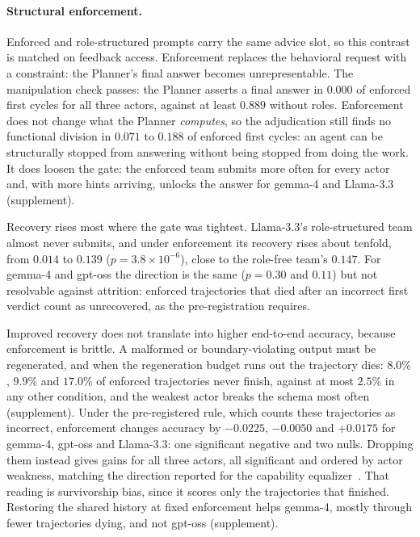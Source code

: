 \paragraph{Structural enforcement.} \label{subsec:enforce} Enforced and role-structured prompts carry the same advice slot, so this
contrast is matched on feedback access. Enforcement replaces the behavioral
request with a constraint: the Planner's final answer becomes
unrepresentable. The manipulation check passes: the Planner asserts a final
answer in $0.000$ of enforced first cycles for all three actors, against at
least $0.889$ without roles. Enforcement does not change what the Planner
\emph{computes}, so the adjudication still finds no functional division in
$0.071$ to $0.188$ of enforced first cycles: an agent can be structurally
stopped from answering without being stopped from doing the work. It does
loosen the gate: the enforced team submits more often for every actor and,
with more hints arriving, unlocks the answer for gemma-4 and Llama-3.3
(supplement).

Recovery rises most where the gate was tightest. Llama-3.3's
role-structured team almost never submits, and under enforcement its
recovery rises about tenfold, from $0.014$ to $0.139$
($p=3.8\times10^{-6}$), close to the role-free team's $0.147$. For gemma-4
and gpt-oss the direction is the same ($p=0.30$ and $0.11$) but not
resolvable against attrition: enforced trajectories that died after an
incorrect first verdict count as unrecovered, as the pre-registration
requires.

Improved recovery does not translate into higher end-to-end accuracy, because
enforcement is brittle. A malformed or boundary-violating output must be
regenerated, and when the regeneration budget runs out the trajectory dies:
$8.0\%$, $9.9\%$ and $17.0\%$ of enforced trajectories never finish,
against at most $2.5\%$ in any other condition, and the weakest actor
breaks the schema most often (supplement). Under the pre-registered rule,
which counts these trajectories as incorrect, enforcement changes accuracy
by $-0.0225$, $-0.0050$ and $+0.0175$ for gemma-4, gpt-oss and Llama-3.3:
one significant negative and two nulls. Dropping them instead gives gains
for all three actors, all significant and ordered by actor weakness,
matching the direction reported for the capability
equalizer~\cite{canedo2026architecture}. That reading is survivorship bias,
since it scores only the trajectories that finished. Restoring the shared
history at fixed enforcement helps gemma-4, mostly through fewer
trajectories dying, and not gpt-oss (supplement).
